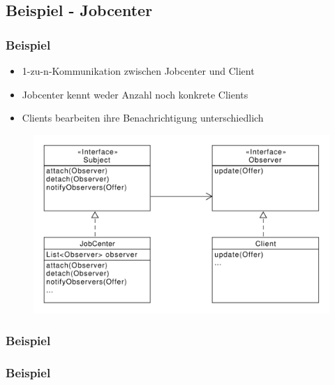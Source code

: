 \subsection{Beispiel - Jobcenter}
\begin{frame}
	\frametitle{Beispiel}
	\begin{itemize}
		\item 1-zu-n-Kommunikation zwischen Jobcenter und Client 
		\item Jobcenter kennt weder Anzahl noch konkrete Clients
		\item Clients bearbeiten ihre Benachrichtigung unterschiedlich
	\end{itemize}		 
  	\begin{figure}
		\includegraphics[scale=.4]{paper/observer/arbeitsvermittlung}
	\end{figure}
\end{frame}


\begin{frame}
\frametitle{Beispiel}

\end{frame}

\begin{frame}
\frametitle{Beispiel}
\end{frame}

